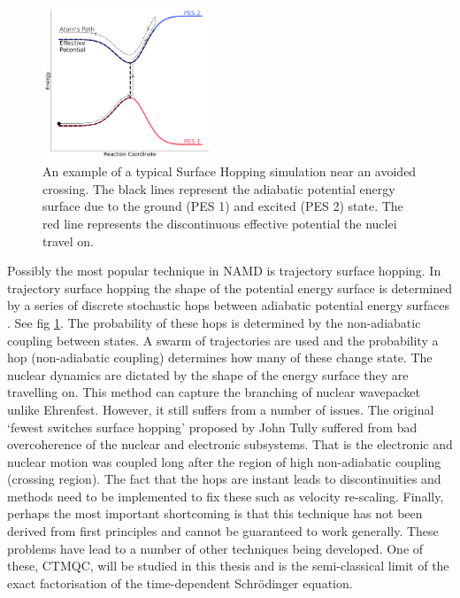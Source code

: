 \begin{figure}
  \includegraphics[width=0.45\textwidth]{./img/SH_hop.png}
  \caption{\label{fig:SH_diag}An example of a typical Surface Hopping simulation near an avoided crossing. The black lines represent the adiabatic potential energy surface due to the ground (PES 1) and excited (PES 2) state. The red line represents the discontinuous effective potential the nuclei travel on.}
\end{figure}
\noindent Possibly the most popular technique in NAMD is trajectory surface hopping. In trajectory surface hopping the shape of the potential energy surface is determined by a series of discrete stochastic hops between adiabatic potential energy surfaces \cite{tully_perspective:_2012}. See fig \ref{fig:SH_diag}.  The probability of these hops is determined by the non-adiabatic coupling between states.
A swarm of trajectories are used and the probability a hop (non-adiabatic coupling) determines how many of these change state. The nuclear dynamics are dictated by the shape of the energy surface they are travelling on. This method can capture the branching of nuclear wavepacket unlike Ehrenfest. However, it still suffers from a number of issues. The original `fewest switches surface hopping' proposed by John Tully suffered from bad overcoherence of the nuclear and electronic subsystems. That is the electronic and nuclear motion was coupled long after the region of high non-adiabatic coupling (crossing region). The fact that the hops are instant leads to discontinuities and methods need to be implemented to fix these such as velocity re-scaling. Finally, perhaps the most important shortcoming is that this technique has not been derived from first principles and cannot be guaranteed to work generally. These problems have lead to a number of other techniques being developed. One of these, CTMQC, will be studied in this thesis and is the semi-classical limit of the exact factorisation of the time-dependent Schr\"odinger equation.
\clearpage
